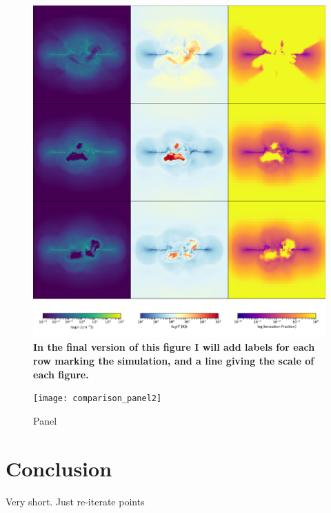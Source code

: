 \documentclass[twocolumn]{aastex62}
\begin{document}
\begin{figure}
\centering
\includegraphics[width=0.99\linewidth]{comparison_panel}
\caption{\textbf{In the final version of this figure I will add labels for each row marking the simulation, and a line giving the scale of each figure.}}
\label{fig:pane1l}
\end{figure}

\begin{figure}
\centering
\texttt{[image: comparison\_panel2]}
\caption{Panel}
\label{fig:pane2}
\end{figure}

\section{Conclusion}  \label{sec:conclusion}
Very short. Just re-iterate points

\begin{thebibliography}{}


\end{thebibliography}


\end{document}
